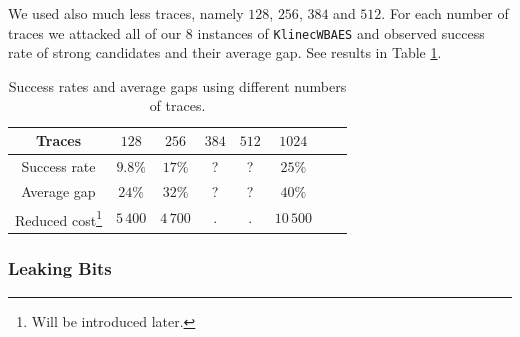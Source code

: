 	We used also much less traces, namely $128$, $256$, $384$ and $512$. For each number of traces we attacked all of our $8$ instances of {\tt KlinecWBAES} and observed success rate of strong candidates and their average gap. See results in Table \ref{tab:ntraces}.
	
	\begin{table}[h]
		\begin{center}
		\begin{tabular}{| c | c | c | c | c | c | c | c |}
			\hline
			Traces       &    $128$ &    $256$ &    $384$ &   $512$ &   $1024$ \\
			\hline
			Success rate &  $9.8\%$ &   $17\%$ &  ?       & ?       &   $25\%$ \\
			\hline
			Average gap  &   $24\%$ &   $32\%$ &  ?       & ?       &   $40\%$ \\
			\hline
			Reduced cost\footnote{Will be introduced later.}
			             & $5\,400$ & $4\,700$ & $.$ & $.$ & $10\,500$ \\
			\hline
		\end{tabular}
		\end{center}
	\caption{Success rates and average gaps using different numbers of traces.}
	\label{tab:ntraces}
	\end{table}
	
	
	
	

\subsubsection{Leaking Bits}
	
